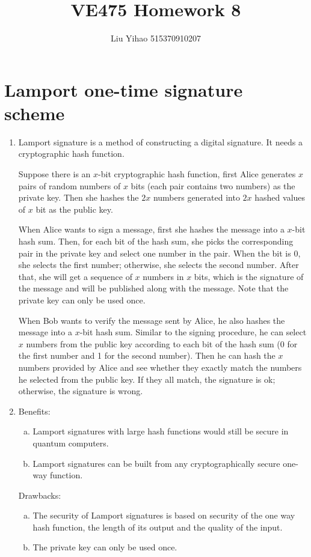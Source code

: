 \documentclass{article}
\title{VE475 Homework 8}
\author{Liu Yihao 515370910207}
\date{}
\begin{document}
\maketitle

\section{Lamport one-time signature scheme}
\begin{enumerate}
\item
Lamport signature is a method of constructing a digital signature. It needs a cryptographic hash function.

Suppose there is an $x$-bit cryptographic hash function, first Alice generates $x$ pairs of random numbers of $x$ bits (each pair contains two numbers) as the private key. Then she hashes the $2x$ numbers generated into $2x$ hashed values of $x$ bit as the public key.

When Alice wants to sign a message, first she hashes the message into a $x$-bit hash sum. Then, for each bit of the hash sum, she picks the corresponding pair in the private key and select one number in the pair. When the bit is 0, she selects the first number; otherwise, she selects the second number. After that, she will get a sequence of $x$ numbers in $x$ bits, which is the signature of the message and will be published along with the message. Note that the private key can only be used once.

When Bob wants to verify the message sent by Alice, he also hashes the message into a $x$-bit hash sum. Similar to the signing procedure, he can select $x$ numbers from the public key according to each bit of the hash sum (0 for the first number and 1 for the second number). Then he can hash the $x$ numbers provided by Alice and see whether they exactly match the numbers he selected from the public key. If they all match, the signature is ok; otherwise, the signature is wrong.

\item
Benefits:
\begin{enumerate}[(a)]
\item Lamport signatures with large hash functions would still be secure in quantum computers.
\item Lamport signatures can be built from any cryptographically secure one-way function.
\end{enumerate}
Drawbacks:
\begin{enumerate}[(a)]
\item The security of Lamport signatures is based on security of the one way hash function, the length of its output and the quality of the input.
\item The private key can only be used once.
\end{enumerate}


\end{enumerate}
\end{document}
